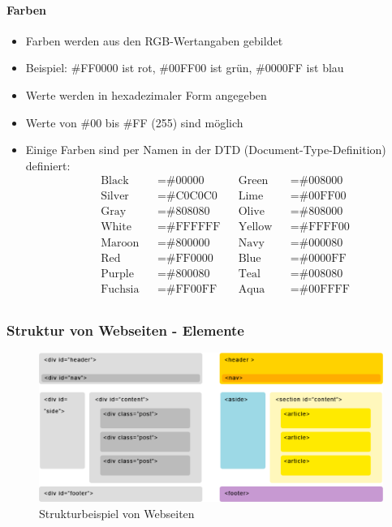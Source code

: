 \paragraph{Farben}
\begin{itemize}[noitemsep,topsep=0pt,leftmargin=*]
    \item Farben werden aus den RGB-Wertangaben gebildet
    \item Beispiel: \#FF0000 ist rot, \#00FF00 ist grün, \#0000FF ist blau
    \item Werte werden in hexadezimaler Form angegeben
    \item Werte von \#00 bis \#FF (255) sind möglich
    \item Einige Farben sind per Namen in der DTD (Document-Type-Definition) definiert:
    \begin{align*}
&\text{Black}&      &=\text{\#00000}&   &\text{Green}&   &=\text{\#008000}\\
&\text{Silver}&     &=\text{\#C0C0C0}&  &\text{Lime}&    &=\text{\#00FF00}\\
&\text{Gray}&       &=\text{\#808080}&  &\text{Olive}&   &=\text{\#808000}\\
&\text{White}&      &=\text{\#FFFFFF}&   &\text{Yellow}&  &=\text{\#FFFF00}\\
&\text{Maroon}&     &=\text{\#800000}&   &\text{Navy}&    &=\text{\#000080}\\
&\text{Red}&        &=\text{\#FF0000}&   &\text{Blue}&    &=\text{\#0000FF}\\
&\text{Purple}&     &=\text{\#800080}&   &\text{Teal}&    &=\text{\#008080}\\
&\text{Fuchsia}&    &=\text{\#FF00FF}&   &\text{Aqua}&    &=\text{\#00FFFF}\\
    \end{align*}
\end{itemize}

\subsubsection{Struktur von Webseiten - Elemente}
\begin{figure}[H]
    \begin{center}
    \includegraphics[width=14cm]{images/struktur.png}
    \caption{Strukturbeispiel von Webseiten}
    \label{strukturHTML}
    \end{center}
\end{figure}

